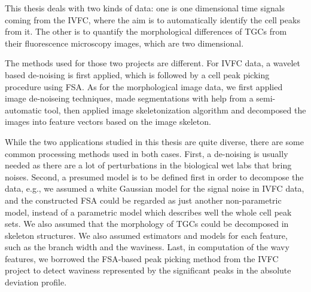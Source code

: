 This thesis deals with two kinds of data: one is one dimensional time signals coming from the \ac{IVFC}, where the aim is to automatically identify the cell peaks from it. The other is to quantify the morphological differences of \aclp{TGC} from their fluorescence microscopy images, which are two dimensional.

The methods used for those two projects are different. For \ac{IVFC} data, a wavelet based de-noising is first applied, which is followed by a cell peak picking procedure using \ac{FSA}. As for the morphological image data, we first applied image de-noiseing techniques, made segmentations with help from a semi-automatic tool, then applied image skeletonization algorithm and decomposed the images into feature vectors based on the image skeleton.

While the two applications studied in this thesis are quite diverse, there are some common processing methods used in both cases. First, a de-noising is usually needed as there are a lot of perturbations in the biological wet labs that bring noises. Second, a presumed model is to be defined first in order to decompose the data, e.g., we assumed a white Gaussian model for the signal noise in \ac{IVFC} data, and the constructed \ac{FSA} could be regarded as just another non-parametric model, instead of a parametric model which describes well the whole cell peak sets. We also assumed that the morphology of \aclp{TGC} could be decomposed in skeleton structures. We also assumed estimators and models for each feature, such as the branch width and the waviness. Last, in computation of the wavy features, we borrowed the \ac{FSA}-based peak picking method from the \ac{IVFC} project to detect waviness represented by the significant peaks in the absolute deviation profile.

\renewcommand{\thesection}{\arabic{chapter}.\arabic{section}}

